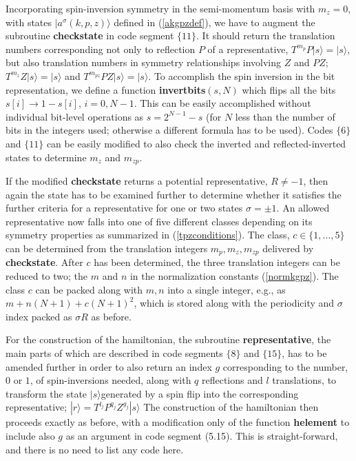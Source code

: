 \documentclass[draft,numberedheadings]{aipproc}
\begin{document}
Incorporating spin-inversion symmetry in the semi-momentum basis with $m_z=0$, with states $|a^\sigma(k,p,z)\rangle$ defined in (\ref{akgpzdef}), we have
to augment the subroutine {\bf checkstate} in code segment $\{11\}$. It should return the translation numbers corresponding not only to reflection $P$
of a representative, $T^{m_p}P|s\rangle = |s\rangle$, but also translation numbers in symmetry relationships involving $Z$ and $PZ$; $T^{m_z}Z|s\rangle = 
|s\rangle$ and $T^{m_{pz}}PZ|s\rangle = |s\rangle$. To accomplish the spin inversion in the bit representation, we define a function {\bf invertbits}$(s,N)$
which flips all the bits $s[i]\to 1-s[i]$, $i=0,N-1$. This can be easily accomplished without individual bit-level operations as $s=2^{N-1}-s$ (for $N$ less
than the number of bits in the integers used; otherwise a different formula has to be used). Codes $\{6\}$ and $\{11\}$ can be easily modified 
to also check the inverted and reflected-inverted states to determine $m_z$ and $m_{zp}$.

If the modified {\bf checkstate} returns a potential representative, $R\not=-1$, then again the state has to be examined further to determine whether it satisfies 
the further criteria for a representative for one or two states $\sigma = \pm 1$. An allowed representative now falls into one of five different classes 
depending on its symmetry properties as summarized in (\ref{tpzconditions}). The class, $c\in \{1,\ldots,5\}$ can be determined from the translation integers 
$m_p,m_z,m_{zp}$ delivered by {\bf checkstate}. After $c$ has been determined, the three translation integers can be reduced to two; the $m$ and $n$ in the 
normalization constants (\ref{normkgpz}). The class $c$ can be packed along with $m,n$ into a single integer, e.g., as $m+n(N+1)+c(N+1)^2$, which is stored 
along with the periodicity and $\sigma$ index packed as $\sigma R$ as before. 

For the construction of the hamiltonian, the subroutine {\bf representative}, the main parts of which are described in code segments $\{8\}$ and $\{15\}$, has 
to be amended further in order to also return an index $g$ corresponding to the number, $0$ or $1$, of spin-inversions needed, along with $q$ reflections and 
$l$ translations, to transform the state $|s\rangle $generated by a spin flip into the corresponding representative; $|r\rangle=T^{l_j}P^{q_j}Z^{g_j}|s\rangle$
The construction of the hamiltonian then proceeds exactly as before, with a modification only of the function {\bf helement} to include also $g$
as an argument in code segment (5.15). This is straight-forward, and there is no need to list any code here.
\end{document}
